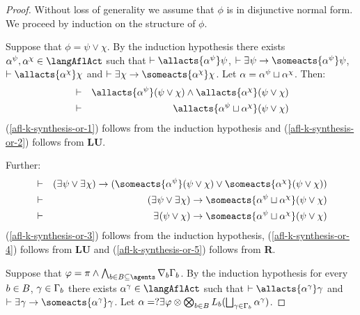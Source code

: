 \begin{proof}
    Without loss of generality we assume that $\phi$ is in disjunctive normal form.
    We proceed by induction on the structure of $\phi$.

    Suppose that $\phi = \psi \lor \chi$.
    By the induction hypothesis there exists $\alpha^\psi, \alpha^\chi \in \langAflAct$ such that $\proves \allacts{\alpha^\psi} \psi$, $\proves \somerefs \psi \implies \someacts{\alpha^\psi} \psi$, $\proves \allacts{\alpha^\chi} \chi$ and $\proves \somerefs \chi \implies \someacts{\alpha^\chi} \chi$.
    Let $\alpha = \alpha^\psi \sqcup \alpha^\chi$.
    Then:
    \begin{eqnarray}
        &\proves& \allacts{\alpha^\psi} (\psi \lor \chi) \land \allacts{\alpha^\chi} (\psi \lor \chi)\label{afl-k-synthesis-or-1}\\
        &\proves& \allacts{\alpha^\psi \choice \alpha^\chi} (\psi \lor \chi)\label{afl-k-synthesis-or-2}
    \end{eqnarray}
    (\ref{afl-k-synthesis-or-1}) follows from the induction hypothesis and
    (\ref{afl-k-synthesis-or-2}) follows from {\bf LU}.

    Further:
    \begin{eqnarray}
        &\proves& (\somerefs \psi \lor \somerefs \chi) \implies (\someacts{\alpha^\psi} (\psi \lor \chi) \lor \someacts{\alpha^\chi} (\psi \lor \chi))\label{afl-k-synthesis-or-3}\\
        &\proves& (\somerefs \psi \lor \somerefs \chi) \implies \someacts{\alpha^\psi \choice \alpha^\chi} (\psi \lor \chi)\label{afl-k-synthesis-or-4}\\
        &\proves& \somerefs (\psi \lor \chi) \implies \someacts{\alpha^\psi \choice \alpha^\chi} (\psi \lor \chi)\label{afl-k-synthesis-or-5}
    \end{eqnarray}
    (\ref{afl-k-synthesis-or-3}) follows from the induction hypothesis,
    (\ref{afl-k-synthesis-or-4}) follows from {\bf LU} and
    (\ref{afl-k-synthesis-or-5}) follows from {\bf R}.

    Suppose that $\phi = \pi \land \bigwedge_{\agentB \in \agentsB \subseteq \agents} \coversB \Gamma_\agentB$.
    By the induction hypothesis for every $b \in B$, $\gamma \in \Gamma_b$ there exists $\alpha^\gamma \in \langAflAct$ such that $\proves \allacts{\alpha^\gamma} \gamma$ and $\proves \somerefs \gamma \implies \someacts{\alpha^\gamma} \gamma$.
    Let $\alpha = \test{\somerefs \phi} \compose \bigcompose_{\agentB \in \agentsB} \learns_\agentB (\bigchoice_{\gamma \in \Gamma_\agentB} \alpha^\gamma)$.


\end{proof}
